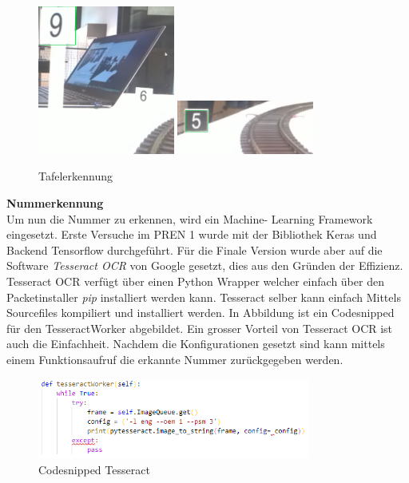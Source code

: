 \documentclass[../../main.tex]{subfiles}
\begin{document}
\vspace{0.5cm}

\begin{figure}[H] %
  \centering
  \includegraphics[width=0.4\textwidth]{tafel-weiss.png}
  \includegraphics[width=0.4\textwidth]{tafel-schwarz.png}
  \caption{Tafelerkennung}
  \label{fig:tafelerkennung}
\end{figure}

\vspace{0.5cm}

\textbf{Nummerkennung}\\
Um nun die Nummer zu erkennen, wird ein Machine- Learning Framework eingesetzt. Erste Versuche im PREN 1 wurde mit der Bibliothek Keras und Backend Tensorflow durchgeführt. Für die Finale Version wurde aber auf die Software \textit{Tesseract OCR} von Google gesetzt, dies aus den Gründen der Effizienz. Tesseract OCR verfügt über einen Python Wrapper welcher einfach über den Packetinstaller \textit{pip} installiert werden kann. Tesseract selber kann einfach Mittels Sourcefiles kompiliert und installiert werden. In Abbildung ist ein Codesnipped für den TesseractWorker abgebildet. Ein grosser Vorteil von Tesseract OCR ist auch die Einfachheit. Nachdem die Konfigurationen gesetzt sind kann mittels einem Funktionsaufruf die erkannte Nummer zurückgegeben werden.

\begin{figure}[H] %
  \centering
  \includegraphics[width=0.8\textwidth]{codesnipped-tesseract.png}
  \caption{Codesnipped Tesseract}
  \label{fig:codesnipped_tesseract}
\end{figure}
\end{document}
